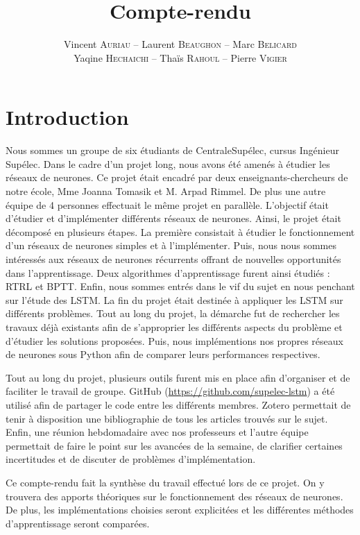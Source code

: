 \documentclass{report}
\title{Compte-rendu}
\author{Vincent \textsc{Auriau} -- Laurent \textsc{Beaughon} -- Marc \textsc{Belicard} \\ Yaqine \textsc{Hechaichi} -- Thaïs \textsc{Rahoul} -- Pierre \textsc{Vigier}}
\theoremstyle{plain}
\theoremstyle{definition}
\theoremstyle{remark}
\begin{document}
\maketitle

\tableofcontents

\chapter*{Introduction}

Nous sommes un groupe de six étudiants de CentraleSupélec, cursus Ingénieur Supélec. Dans le cadre d'un projet long, nous avons été amenés à étudier les réseaux de neurones. Ce projet était encadré par deux enseignants-chercheurs de notre école, Mme Joanna Tomasik et M. Arpad Rimmel. De plus une autre équipe de 4 personnes effectuait le même projet en parallèle. L'objectif était d'étudier et d'implémenter différents réseaux de neurones. Ainsi, le projet était décomposé en plusieurs étapes. La première consistait à étudier le fonctionnement d'un réseaux de neurones simples et à l'implémenter. Puis, nous nous sommes intéressés aux réseaux de neurones récurrents offrant de nouvelles opportunités dans l'apprentissage. Deux algorithmes d'apprentissage furent ainsi étudiés : RTRL et BPTT. Enfin, nous sommes entrés dans le vif du sujet en nous penchant sur l'étude des LSTM. La fin du projet était destinée à appliquer les LSTM sur différents problèmes. Tout au long du projet, la démarche fut de rechercher les travaux déjà existants afin de s'approprier les différents aspects du problème et d'étudier les solutions proposées. Puis, nous implémentions nos propres réseaux de neurones sous Python afin de comparer leurs performances respectives.

Tout au long du projet, plusieurs outils furent mis en place afin d'organiser et de faciliter le travail de groupe. GitHub (\url{https://github.com/supelec-lstm}) a été utilisé afin de partager le code entre les différents membres. Zotero permettait de tenir à disposition une bibliographie de tous les articles trouvés sur le sujet. Enfin, une réunion hebdomadaire avec nos professeurs et l'autre équipe permettait de faire le point sur les avancées de la semaine, de clarifier certaines incertitudes et de discuter de problèmes d'implémentation.

Ce compte-rendu fait la synthèse du travail effectué lors de ce projet. On y trouvera des apports théoriques sur le fonctionnement des réseaux de neurones. De  plus, les implémentations choisies seront explicitées et les différentes méthodes d'apprentissage seront comparées.
\end{document}
